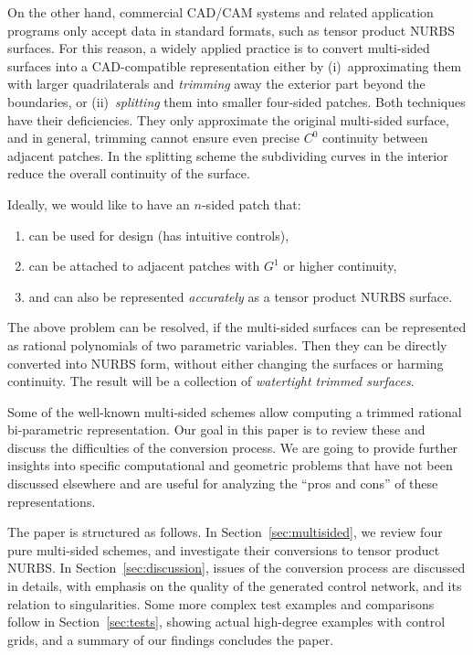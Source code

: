 \documentclass[9pt,academicons]{article}
\begin{document}
On the other hand, commercial CAD/CAM systems and related application programs only accept
data in standard formats, such as tensor product NURBS surfaces. For this reason, a
widely applied practice is to convert multi-sided surfaces into a CAD-compatible
representation either by (i)~approximating them with larger quadrilaterals and
\emph{trimming} away the exterior part beyond the boundaries, or (ii)~\emph{splitting}
them into smaller four-sided patches.
Both techniques have their deficiencies. They only approximate the original multi-sided
surface, and in general, trimming cannot ensure even precise $C^0$ continuity between
adjacent patches. In the splitting scheme the subdividing curves in the interior
reduce the overall continuity of the surface.

Ideally, we would like to have an $n$-sided patch that:
\begin{enumerate}[label=\roman*),leftmargin=3\parindent]
\item can be used for design (has intuitive controls),
\item can be attached to adjacent patches with $G^1$ or higher continuity,
\item and can also be represented \emph{accurately} as a tensor product NURBS surface.
\end{enumerate}

The above problem can be resolved, if the multi-sided surfaces can be represented as rational
polynomials of two parametric variables. Then they can be directly converted into
NURBS form, without either changing the surfaces or harming continuity. The result will be
a collection of \emph{watertight trimmed surfaces}.
 
Some of the well-known multi-sided schemes allow computing a trimmed rational bi-parametric
representation. Our goal in this paper is to review these and discuss the difficulties of
the conversion process. We are going to provide further insights into specific
computational and geometric problems that have not been discussed elsewhere and are
useful for analyzing the ``pros and cons'' of these representations.

The paper is structured as follows. In Section~\ref{sec:multisided},
we review four pure multi-sided schemes, and investigate their conversions to tensor product NURBS.
In Section~\ref{sec:discussion}, issues of the conversion process are discussed in details,
with emphasis on the quality of the generated control network, and its relation to singularities.
Some more complex test examples and comparisons follow in Section~\ref{sec:tests},
showing actual high-degree examples with control grids,
and a summary of our findings concludes the paper.
\end{document}
